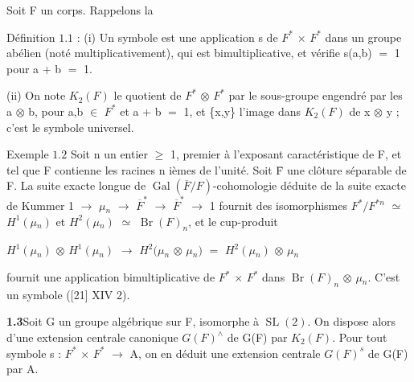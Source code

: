 \documentclass[10pt,a4paper]{article}
\begin{document}
\clearpage
{}
\label{d035-physical-009}
\par\medskip{}\par\smallskip
\par Soit F un corps. Rappelons la\par
\par Définition $1.1$ : (i) Un symbole est une application s de $F^*$ $\times{}$ $F^*$ dans un groupe abélien (noté multiplicativement), qui est bimultiplicative, et vérifie s(a,b) $=$ 1 pour a + b $=$ 1.\par
\par (ii) On note $K_2(F)$ le quotient de $F^*$ $\otimes{}$ $F^*$ par le sous-groupe engendré par les a $\otimes{}$ b, pour a,b $\in{}$ $F^*$ et a + b $=$ 1, et \{x,y\} l'image dans $K_2(F)$ de x $\otimes{}$ y ; c'est le symbole universel.\par
\par Exemple $1.2$ Soit n un entier $\ge{}$ 1, premier à l'exposant caractéristique de F, et tel que F contienne les racines n ièmes de l'unité. Soit F̄ une clôture séparable de F. La suite exacte longue de $\operatorname{Gal}(\overline{F}/F)$-cohomologie déduite de la suite exacte de Kummer 1 $\to{}$ $\mu{}_n$ $\to{}$ $\overline{F}^*$ $\to{}$ $\overline{F}^*$ $\to{}$ 1 fournit des isomorphismes $F^*/F^{*n}$ $\simeq{}$ $H^1(\mu{}_n)$ et $H^2(\mu{}_n)$ $\simeq{}$ $\operatorname{Br}(F)_n$, et le cup-produit\par
\par\smallskip\begin{center}\begin{minipage}{0.96\textwidth}\centering
$H^1(\mu{}_n)$ $\otimes{}$ $H^1(\mu{}_n)$ $\to{}$ $H^2(\mu{}_n$ $\otimes{}$ $\mu{}_n)$ $=$ $H^2(\mu{}_n)$ $\otimes{}$ $\mu{}_n$
\end{minipage}\end{center}\smallskip
\par fournit une application bimultiplicative de $F^*$ $\times{}$ $F^*$ dans $\operatorname{Br}(F)_n$ $\otimes{}$ $\mu{}_n$. C'est un symbole ([21] XIV 2).\par
\par\noindent\textbf{1.3}\quad Soit G un groupe algébrique sur F, isomorphe à $\operatorname{SL}(2)$. On dispose alors d'une extension centrale canonique $G(F)^\wedge{}$ de G(F) par $K_2(F)$. Pour tout symbole s : $F^*$ $\times{}$ $F^*$ $\to{}$ A, on en déduit une extension centrale $G(F)^s$ de G(F) par A.\par
\end{document}
